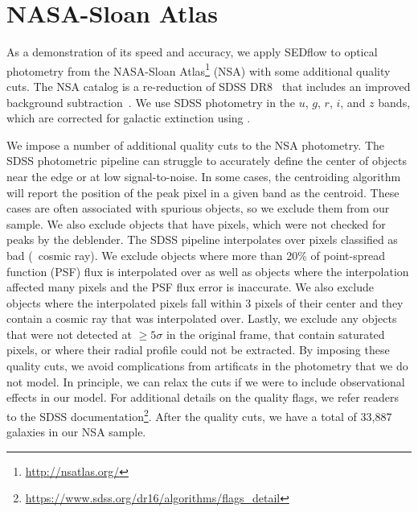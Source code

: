 \section{NASA-Sloan Atlas} \label{sec:obs}
As a demonstration of its speed and accuracy, we apply {\sc SEDflow} to optical
photometry from the NASA-Sloan Atlas\footnote{\url{http://nsatlas.org/}} (NSA)
with some additional quality cuts.
The NSA catalog is a re-reduction of SDSS DR8~\citep{aihara2011} that includes
an improved background subtraction~\citep{blanton2011}.
We use SDSS photometry in the $u$, $g$, $r$, $i$, and $z$ bands, which are
corrected for galactic extinction using \cite{schlegel1998}.

We impose a number of additional quality cuts to the NSA photometry.
The SDSS photometric pipeline can struggle to accurately define the center
of objects near the edge or at low signal-to-noise. 
In some cases, the centroiding algorithm will report the position of the peak
pixel in a given band as the centroid. 
These cases are often associated with spurious objects, so we exclude them
from our sample. 
We also exclude objects that have pixels, which were not checked for peaks
by the deblender. %
The SDSS pipeline interpolates over pixels classified as bad (\eg~cosmic ray).
We exclude objects where more than 20\% of point-spread function (PSF) flux is
interpolated over as well as objects where the interpolation affected many
pixels and the PSF flux error is inaccurate. 
We also exclude objects where the interpolated pixels fall within 3 pixels of
their center and they contain a cosmic ray that was interpolated over.
Lastly, we exclude any objects that were not detected at $\ge5\sigma$ in the
original frame, that contain saturated pixels, or where their radial profile 
could not be extracted.
By imposing these quality cuts, we avoid complications from artificats in the
photometry that we do not model. 
In principle, we can relax the cuts if we were to include observational effects
in our model.
For additional details on the quality flags, we refer readers to the SDSS
documentation\footnote{\url{https://www.sdss.org/dr16/algorithms/flags_detail}}.
After the quality cuts, we have a total of 33,887 galaxies in our NSA sample.





